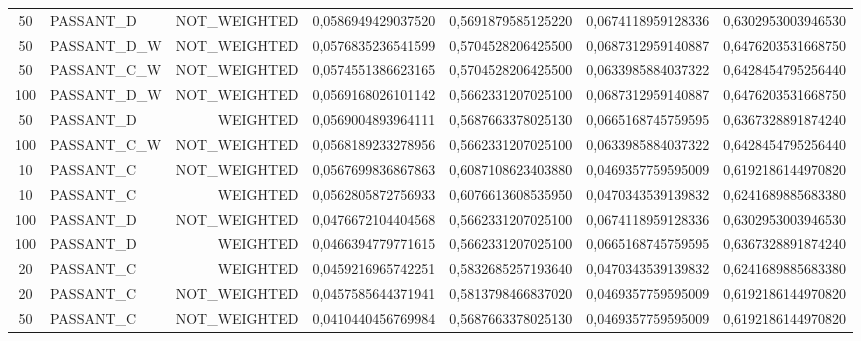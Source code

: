\begin{table}[H]
{\begin{tabular}{ c l r c c c c }
				50 &  PASSANT\_D & NOT\_WEIGHTED & 0,0586949429037520 & 0,5691879585125220 & 0,0674118959128336 & 0,6302953003946530 \\
				
				50 & PASSANT\_D\_W & NOT\_WEIGHTED & 0,0576835236541599 & 0,5704528206425500 & 0,0687312959140887 & 0,6476203531668750 \\
				
				50 & PASSANT\_C\_W & NOT\_WEIGHTED & 0,0574551386623165 & 0,5704528206425500 & 0,0633985884037322 & 0,6428454795256440 \\
				
				100 & PASSANT\_D\_W & NOT\_WEIGHTED & 0,0569168026101142 & 0,5662331207025100 & 0,0687312959140887 & 0,6476203531668750 \\
				
				50 &  PASSANT\_D &   WEIGHTED & 0,0569004893964111 & 0,5687663378025130 & 0,0665168745759595 & 0,6367328891874240 \\
				
				100 & PASSANT\_C\_W & NOT\_WEIGHTED & 0,0568189233278956 & 0,5662331207025100 & 0,0633985884037322 & 0,6428454795256440 \\
				
				10 &  PASSANT\_C & NOT\_WEIGHTED & 0,0567699836867863 & 0,6087108623403880 & 0,0469357759595009 & 0,6192186144970820 \\
				
				10 &  PASSANT\_C &   WEIGHTED & 0,0562805872756933 & 0,6076613608535950 & 0,0470343539139832 & 0,6241689885683380 \\
				
				100 &  PASSANT\_D & NOT\_WEIGHTED & 0,0476672104404568 & 0,5662331207025100 & 0,0674118959128336 & 0,6302953003946530 \\
				
				100 &  PASSANT\_D &   WEIGHTED & 0,0466394779771615 & 0,5662331207025100 & 0,0665168745759595 & 0,6367328891874240 \\
				
				20 &  PASSANT\_C &   WEIGHTED & 0,0459216965742251 & 0,5832685257193640 & 0,0470343539139832 & 0,6241689885683380 \\
				
				20 &  PASSANT\_C & NOT\_WEIGHTED & 0,0457585644371941 & 0,5813798466837020 & 0,0469357759595009 & 0,6192186144970820 \\
				
				50 &  PASSANT\_C & NOT\_WEIGHTED & 0,0410440456769984 & 0,5687663378025130 & 0,0469357759595009 & 0,6192186144970820 \\
				

\end{tabular}}
\end{table}
